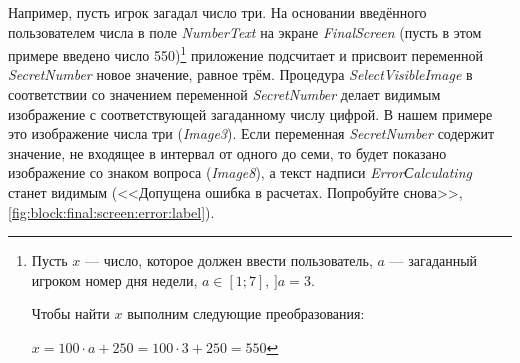Например, пусть игрок загадал число три. На основании введённого пользователем числа в поле \textit{NumberText} на экране \textit{FinalScreen}
(пусть в этом примере введено число 550)\footnote[][0.5cm]{ Пусть $ x $ — число, которое должен ввести пользователь, $ a $ — загаданный игроком номер дня недели, $ a \in [1;7] $, $ ] a = 3 $. 

Чтобы найти $ x $ выполним следующие преобразования:

$ x = 100 \cdot a + 250  = 100 \cdot 3 + 250  = 550 $}\marginnote[0.2cm]{} приложение подсчитает и присвоит переменной \textit{SecretNumber} новое значение, равное трём.
Процедура \textit{SelectVisibleImage} в соответствии со значением переменной \textit{SecretNumber} делает видимым изображение с соответствующей загаданному числу цифрой. 
В нашем примере это изображение числа три (\textit{Image3}). Если переменная \textit{SecretNumber} содержит значение, не входящее в интервал от одного до семи, то будет показано изображение со знаком вопроса (\textit{Image8}), а текст надписи \textit{ErrorСalculating} станет видимым (<<Допущена ошибка в расчетах. Попробуйте снова>>,\ref{fig:block:final:screen:error:label}).
